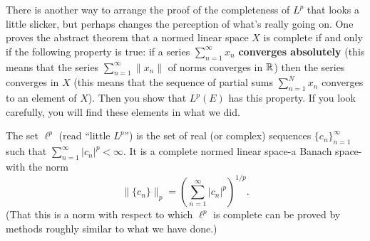 \begin{rmk}%
	There is another way to arrange the proof of the completeness of $L^p$ that looks a little 
	slicker, but perhaps changes the perception of what's really going on. One proves the abstract 
	theorem that a normed linear space $X$ is complete if and only if the following property is 
	true: if a series $\sum\limits_{n=1}^\infty x_n$ \textbf{converges absolutely} (this means 
	that the series $\sum\limits_{n=1}^\infty \|x_n\|$ of norms converges in $\mathbb{R}$) then the series 
	converges in $X$ (this means that the sequence of partial sums $\sum\limits_{n=1}^N x_n$ 
	converges to an element of $X$). Then you show that $L^p(E)$ has this property. If you look 
	carefully, you will find these elements in what we did.
\end{rmk}

\begin{defn}%
	The set $\ell^p$ (read ``little $L^p$'') is the set of real (or complex) sequences $\{c_n\}_{n=1}^\infty$ 
	such that $\sum\limits_{n=1}^\infty |c_n|^p < \infty$. It is a complete normed linear space-a 
	Banach space-with the norm 
	\begin{equation*}
		\|\{c_n\}\|_p = \left(\sum\limits_{n=1}^\infty |c_n|^p\right)^{1/p}. 
	\end{equation*}
	(That this is a norm with respect to which $\ell^p$ is complete can be proved by methods 
	roughly similar to what we have done.)
\end{defn}

